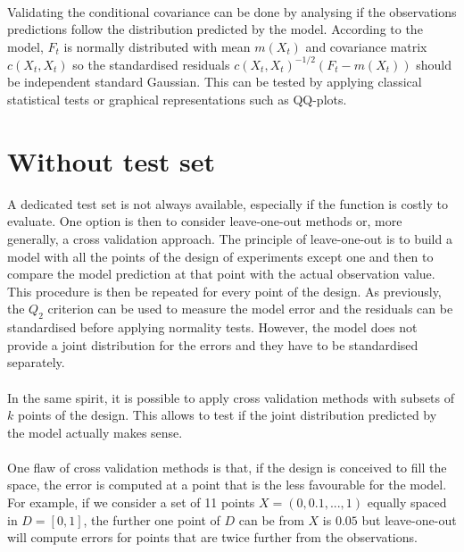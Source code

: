 \documentclass[twoside,openright]{report}
\begin{document}
\paragraph{}
Validating the conditional covariance can be done by analysing if the observations predictions follow the distribution predicted by the model. According to the model, $F_t$ is normally distributed with mean $m(X_t)$ and covariance matrix $c(X_t,X_t)$ so the standardised residuals $c(X_t,X_t)^{-1/2}(F_t-m(X_t))$ should be independent standard Gaussian. This can be tested by applying classical statistical tests or graphical representations such as QQ-plots.

\section{Without test set}
A dedicated test set is not always available, especially if the function is costly to evaluate. One option is then to consider leave-one-out methods or, more generally, a cross validation approach. The principle of leave-one-out is to build a model with all the points of the design of experiments except one and then to compare the model prediction at that point with the actual observation value. This procedure is then be repeated for every point of the design. As previously, the $Q_2$ criterion can be used to measure the model error and the residuals can be standardised before applying normality tests. However, the model does not provide a joint distribution for the errors and they have to be standardised separately.

\paragraph{}
In the same spirit, it is possible to apply cross validation methods with subsets of $k$ points of the design. This allows to test if the joint distribution predicted by the model actually makes sense.

\paragraph{}
One flaw of cross validation methods is that, if the design is conceived to fill the space, the error is computed at a point that is the  less favourable for the model. For example, if we consider a set of 11 points $X=(0,0.1,...,1)$ equally spaced in $D = [0,1]$, the further one point of $D$ can be from $X$ is $0.05$ but leave-one-out will compute errors for points that are twice further from the observations. 
\end{document}
